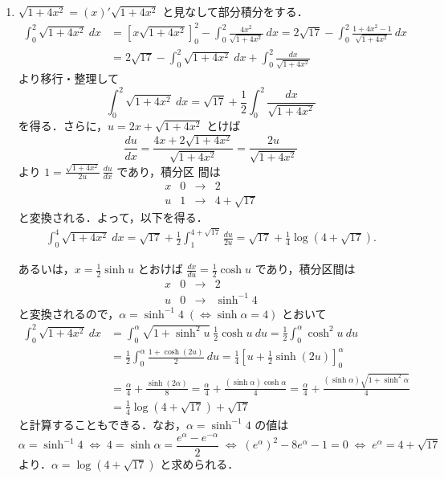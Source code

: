 \documentclass[11pt, uplatex, dvipdfmx]{jsarticle}
\newcommand{\ds}{\displaystyle}
\begin{document}
\begin{enumerate}[(1)]
   \item $\sqrt{1+4x^2} = \left( x \right)' \sqrt{1+4x^2}$ と見なして部分積分をする．
     \begin{align*}
       \int_{0}^{2} \sqrt{1+4x^2} \ dx &= \left[ x \sqrt{1+4x^2}
       \right]_{0}^{2} - \int_{0}^{2}\frac{4x^2}{\sqrt{1+4x^2}} \ dx =
       2\sqrt{17} - \int_{0}^{2} \frac{1+4x^2-1}{\sqrt{1+4x^2}} \ dx\\
       &= 2\sqrt{17} - \int_{0}^{2} \sqrt{1+4x^2} \ dx + \int_{0}^{2} \frac{dx}{\sqrt{1+4x^2}}
     \end{align*}
     より移行・整理して
     \[
       \int_{0}^{2}\sqrt{1+4x^2} \ dx  = \sqrt{17} + \frac{1}{2} \int_{0}^{2} \frac{dx}{\sqrt{1+4x^2}}
     \]
     を得る．さらに，$u=2x+\sqrt{1+4x^2}$ とけば
     \[
       \frac{du}{dx} =\frac{4x+2\sqrt{1+4x^2}}{\sqrt{1+4x^2}} =
       \frac{2u}{\sqrt{1+4x^2}}
     \]
     より $\ds 1 = \frac{\sqrt{1+4x^2}}{2u} \ \frac{du}{dx}$ であり，積分区
     間は
     \[
       \begin{array}{c|ccc} x & 0 & \to & 2\\ \hline
         u & 1 & \to & 4+\sqrt{17}
       \end{array}
     \]
     と変換される．よって，以下を得る．
     \begin{align*}
       \int_{0}^{4} \sqrt{1+4x^2} \ dx = \sqrt{17} + \frac{1}{2} \int_{1}^{4+\sqrt{17}} \frac{du}{2u}
       = \sqrt{17} + \frac{1}{4} \log \left( 4+\sqrt{17} \right).
     \end{align*}

     あるいは，$x=\frac{1}{2}\sinh u$ とおけば $\frac{dx}{du} = \frac{1}{2} \cosh u$ であり，積分区間は
     \[
       \begin{array}{c|ccc}
         x & 0 & \to & 2\\ \hline
         u & 0 & \to & \sinh^{-1}4
       \end{array}
     \]
     と変換されるので，$\alpha=\sinh^{-1}4 \;(\Leftrightarrow \sinh \alpha =4)$ とおいて
     \[
       \begin{aligned}
         \int_{0}^{2}\sqrt{1+4x^2} \ dx &= \int_{0}^{\alpha} \sqrt{1+\sinh^2 u}\  \frac{1}{2}\cosh u \ du
         =\frac{1}{2}\int_{0}^{\alpha} \cosh^2 u \ du\\
         &= \frac{1}{2}\int_{0}^{\alpha} \frac{1+\cosh (2u)}{2} \ du
         = \frac{1}{4} \left[ u + \frac{1}{2}\sinh(2u)\right]_{0}^{\alpha}\\
         &= \frac{\alpha}{4} + \frac{\sinh(2\alpha)}{8}
         =\frac{\alpha}{4} + \frac{(\sinh \alpha) \cosh \alpha}{4}
         =\frac{\alpha}{4} + \frac{(\sinh \alpha) \sqrt{1+\sinh^2\alpha}}{4}\\
         &= \frac{1}{4}\log\left(4+\sqrt{17}\right) + \sqrt{17}
       \end{aligned}
     \]
     と計算することもできる．なお，$\alpha=\sinh^{-1}4$ の値は
     \[
       \alpha = \sinh^{-1}4 \; \Leftrightarrow \; 4 = \sinh \alpha = \frac{e^{\alpha}-e^{-\alpha}}{2}
       \; \Leftrightarrow \; \left( e^{\alpha}\right)^2 - 8 e^{\alpha} -1=0 \; \Leftrightarrow \;
       e^{\alpha} = 4 + \sqrt{17}
     \]
     より．$\alpha = \log\left(4+\sqrt{17}\right)$ と求められる．



\end{enumerate}
\end{document}
